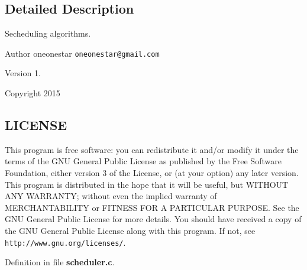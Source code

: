 \subsection{Detailed Description}
Secheduling algorithms. 

\begin{DoxyAuthor}{Author}
oneonestar {\tt oneonestar@gmail.\+com} 
\end{DoxyAuthor}
\begin{DoxyVersion}{Version}
1. 
\end{DoxyVersion}
\begin{DoxyCopyright}{Copyright}
2015
\end{DoxyCopyright}
\subsection{L\+I\+C\+E\+N\+S\+E}\label{user_8h_LICENSE}
This program is free software\+: you can redistribute it and/or modify it under the terms of the G\+N\+U General Public License as published by the Free Software Foundation, either version 3 of the License, or (at your option) any later version. This program is distributed in the hope that it will be useful, but W\+I\+T\+H\+O\+U\+T A\+N\+Y W\+A\+R\+R\+A\+N\+T\+Y; without even the implied warranty of M\+E\+R\+C\+H\+A\+N\+T\+A\+B\+I\+L\+I\+T\+Y or F\+I\+T\+N\+E\+S\+S F\+O\+R A P\+A\+R\+T\+I\+C\+U\+L\+A\+R P\+U\+R\+P\+O\+S\+E. See the G\+N\+U General Public License for more details. You should have received a copy of the G\+N\+U General Public License along with this program. If not, see {\tt http\+://www.\+gnu.\+org/licenses/}. 

Definition in file {\bf scheduler.\+c}.

